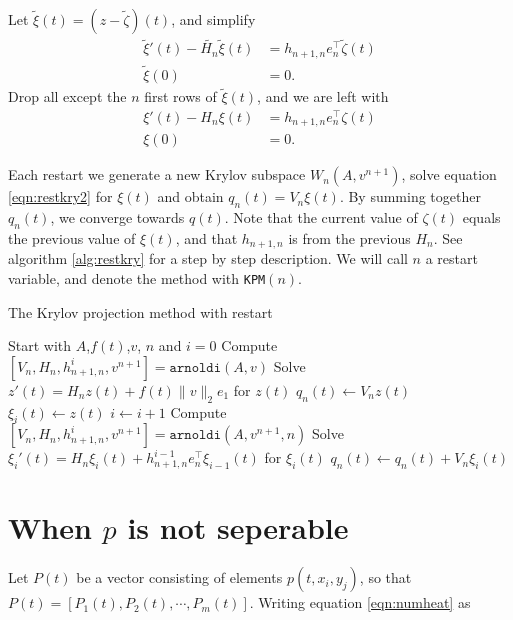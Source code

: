 Let $\tilde{\xi}(t) = (z-\tilde{\zeta})(t)$, and simplify
\begin{equation*} 
\begin{aligned}
 \tilde{\xi} '(t) -\tilde{H_n} \tilde{\xi}(t) &= h_{n+1,n}e_n^\top \tilde{\zeta} (t)  \\
\tilde{\xi}(0)& = 0.
\end{aligned}
\end{equation*}
Drop all except the $n$ first rows of $\tilde{\xi}(t)$, and we are left with
\begin{equation}\label{eqn:restkry2}
\begin{aligned}
 \xi '(t) -H_n \xi(t) &= h_{n+1,n}e_n^\top \zeta (t)  \\
\xi(0)& = 0.
\end{aligned}
\end{equation}

Each restart we generate a new Krylov subspace $W_n(A,v^{n+1})$, solve equation \eqref{eqn:restkry2} for $\xi(t)$ and obtain $ q_n(t) =  V_n\xi(t)$. By summing together $q_n(t)$, we converge towards $q(t)$. Note that the current value of $\zeta(t)$ equals the previous value of $\xi(t)$, and that $h_{n+1,n}$ is from the previous $H_n$. See algorithm \ref{alg:restkry} for a step by step description. We will call $n$ a restart variable, and denote the method with \texttt{KPM}$(n)$.
\begin{algorithm}
\begin{algorithmic} \caption{The Krylov projection method with restart} \label{alg:restkry} 
\STATE Start with $A$,$f(t)$,$v$, $n$ and $i = 0$
\STATE Compute $[V_n,H_n,h_{n+1,n}^i,v^{n+1}] = \texttt{arnoldi}(A,v)$
\STATE Solve $  z'(t) = H_n z(t) + f(t) \| v \|_2 e_1  $ for $z(t)$
\STATE $ q_n(t) \leftarrow  V_n z(t) $
\STATE $\xi_i(t) \leftarrow z(t)$
    \STATE $i \leftarrow i + 1$
    \STATE Compute $[V_n,H_n,h_{n+1,n}^i,v^{n+1}] = \texttt{arnoldi}(A,v^{n+1},n)$
    \STATE Solve $ \xi_i'(t) = H_n \xi_i(t) + h_{n+1,n}^{i-1}e_n^\top \xi_{i-1}(t)  $ for $\xi_i(t)$
    \STATE $ q_n(t) \leftarrow q_n(t) + V_n \xi_i(t) $
\ENDWHILE
\end{algorithmic} 
\end{algorithm}

\section{When $p$ is not seperable} \label{sec:nonsep}
Let $P(t)$ be a vector consisting of elements $p(t, x_i, y_j)$, so that $P(t) = [P_1(t),P_2(t),\cdots, P_m(t)]$. Writing equation \eqref{eqn:numheat} as

